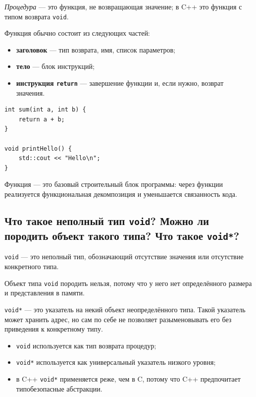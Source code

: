 \begin{definition}[Процедура]
\textit{Процедура} — это функция, не возвращающая значение; в C++ это функция с типом возврата \texttt{void}.
\end{definition}

Функция обычно состоит из следующих частей:
\begin{itemize}
    \item \textbf{заголовок} — тип возврата, имя, список параметров;
    \item \textbf{тело} — блок инструкций;
    \item \textbf{инструкция \texttt{return}} — завершение функции и, если нужно, возврат значения.
\end{itemize}

\begin{example}
\begin{verbatim}
int sum(int a, int b) {
    return a + b;
}

void printHello() {
    std::cout << "Hello\n";
}
\end{verbatim}
\end{example}

\begin{remark}
Функция — это базовый строительный блок программы: через функции реализуется функциональная декомпозиция и уменьшается связанность кода.
\end{remark}

\subsection{Что такое неполный тип \texttt{void}? Можно ли породить объект такого типа? Что такое \texttt{void*}?}
\begin{definition}[void]
\texttt{void} — это неполный тип, обозначающий отсутствие значения или отсутствие конкретного типа.
\end{definition}

Объект типа \texttt{void} породить нельзя, потому что у него нет определённого размера и представления в памяти.

\texttt{void*} — это указатель на некий объект неопределённого типа. Такой указатель может хранить адрес, но сам по себе не позволяет разыменовывать его без приведения к конкретному типу.

\begin{itemize}
    \item \texttt{void} используется как тип возврата процедур;
    \item \texttt{void*} используется как универсальный указатель низкого уровня;
    \item в C++ \texttt{void*} применяется реже, чем в C, потому что C++ предпочитает типобезопасные абстракции.
\end{itemize}

